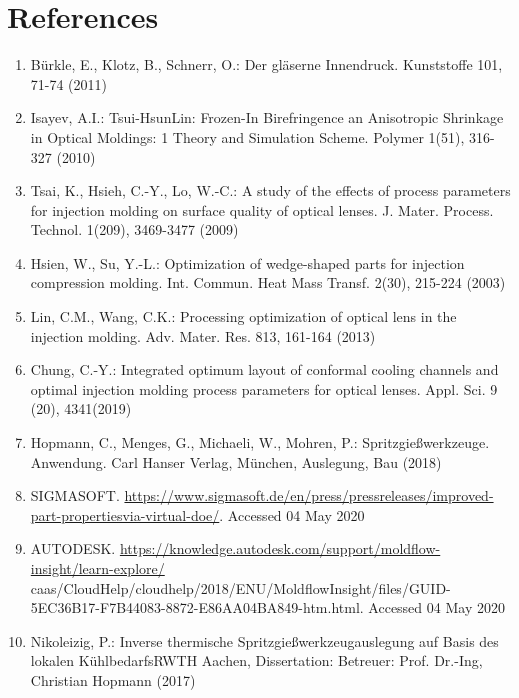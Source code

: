 \documentclass[10pt]{article}
\begin{document}
\section*{References}
\begin{enumerate}
  \item Bürkle, E., Klotz, B., Schnerr, O.: Der gläserne Innendruck. Kunststoffe 101, 71-74 (2011)

  \item Isayev, A.I.: Tsui-HsunLin: Frozen-In Birefringence an Anisotropic Shrinkage in Optical Moldings: 1 Theory and Simulation Scheme. Polymer 1(51), 316-327 (2010)

  \item Tsai, K., Hsieh, C.-Y., Lo, W.-C.: A study of the effects of process parameters for injection molding on surface quality of optical lenses. J. Mater. Process. Technol. 1(209), 3469-3477 (2009)

  \item Hsien, W., Su, Y.-L.: Optimization of wedge-shaped parts for injection compression molding. Int. Commun. Heat Mass Transf. 2(30), 215-224 (2003)

  \item Lin, C.M., Wang, C.K.: Processing optimization of optical lens in the injection molding. Adv. Mater. Res. 813, 161-164 (2013)

  \item Chung, C.-Y.: Integrated optimum layout of conformal cooling channels and optimal injection molding process parameters for optical lenses. Appl. Sci. 9 (20), 4341(2019)

  \item Hopmann, C., Menges, G., Michaeli, W., Mohren, P.: Spritzgießwerkzeuge. Anwendung. Carl Hanser Verlag, München, Auslegung, Bau (2018)

  \item SIGMASOFT. \href{https://www.sigmasoft.de/en/press/pressreleases/improved-part-propertiesvia-virtual-doe/}{https://www.sigmasoft.de/en/press/pressreleases/improved-part-propertiesvia-virtual-doe/}. Accessed 04 May 2020

  \item AUTODESK. \href{https://knowledge.autodesk.com/support/moldflow-insight/learn-explore/}{https://knowledge.autodesk.com/support/moldflow-insight/learn-explore/} caas/CloudHelp/cloudhelp/2018/ENU/MoldflowInsight/files/GUID-5EC36B17-F7B44083-8872-E86AA04BA849-htm.html. Accessed 04 May 2020

  \item Nikoleizig, P.: Inverse thermische Spritzgießwerkzeugauslegung auf Basis des lokalen KühlbedarfsRWTH Aachen, Dissertation: Betreuer: Prof. Dr.-Ing, Christian Hopmann (2017)


\end{enumerate}
\end{document}
